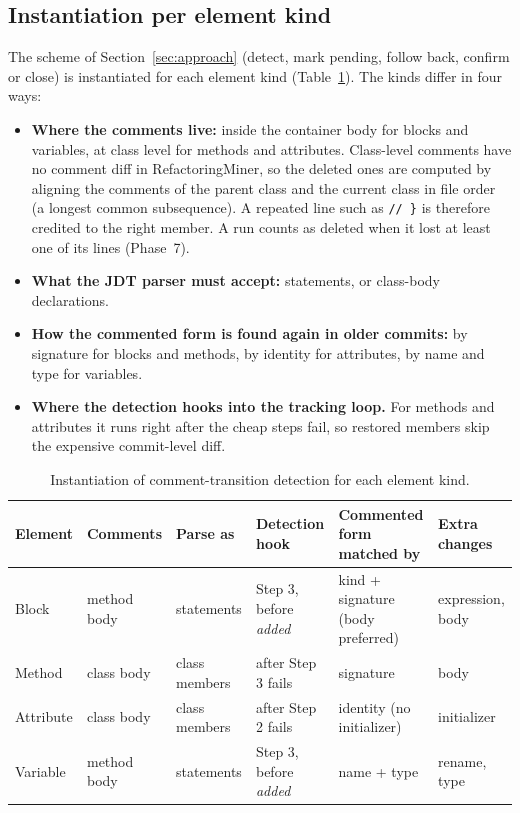\documentclass[11pt,a4paper]{article}
\newcommand{\code}[1]{\texttt{#1}}
\newcommand{\change}[1]{\textit{#1}}
\begin{document}
\subsection{Instantiation per element kind}
The scheme of Section~\ref{sec:approach} (detect, mark pending, follow back, confirm or close) is instantiated for each element kind (Table~\ref{tab:kinds}). The kinds differ in four ways:
\begin{itemize}
  \item \textbf{Where the comments live:} inside the container body for blocks and variables, at class level for methods and attributes. Class-level comments have no comment diff in RefactoringMiner, so the deleted ones are computed by aligning the comments of the parent class and the current class in file order (a longest common subsequence). A repeated line such as \code{//    \}} is therefore credited to the right member. A run counts as deleted when it lost at least one of its lines (Phase~7).
  \item \textbf{What the JDT parser must accept:} statements, or class-body declarations.
  \item \textbf{How the commented form is found again in older commits:} by signature for blocks and methods, by identity for attributes, by name and type for variables.
  \item \textbf{Where the detection hooks into the tracking loop.} For methods and attributes it runs right after the cheap steps fail, so restored members skip the expensive commit-level diff.
\end{itemize}

\begin{table}[t]
\centering\small
\caption{Instantiation of comment-transition detection for each element kind.}
\label{tab:kinds}
\begin{tabularx}{\linewidth}{@{}lllXXl@{}}
\toprule
Element & Comments & Parse as & Detection hook & Commented form matched by & Extra changes \\
\midrule
Block & method body & statements & Step 3, before \change{added} & kind + signature (body preferred) & expression, body \\
Method & class body & class members & after Step 3 fails & signature & body \\
Attribute & class body & class members & after Step 2 fails & identity (no initializer) & initializer \\
Variable & method body & statements & Step 3, before \change{added} & name + type & rename, type \\
\bottomrule
\end{tabularx}
\end{table}
\end{document}
